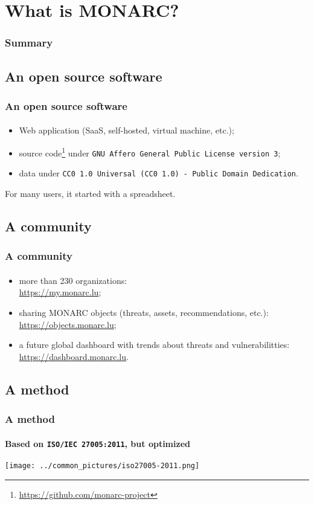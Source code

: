 %
%
\section{What is MONARC?}
\begin{frame}
    \frametitle{Summary}
\end{frame}
\subsection{An open source software}
\begin{frame}
\frametitle{An open source software}
\framesubtitle{}
    \begin{itemize}
        \item Web application (SaaS, self-hosted, virtual machine, etc.);
        \item source code\footnote{\url{https://github.com/monarc-project}} under \texttt{GNU Affero General Public License version 3};
        \item data under \texttt{CC0 1.0 Universal (CC0 1.0) - Public Domain Dedication}.
    \end{itemize}
    \bigskip
    For many users, it started with a spreadsheet.
\end{frame}

\subsection{A community}
\begin{frame}
\frametitle{A community}
\framesubtitle{}
  \begin{itemize}
    \item more than 230 organizations:\\ \url{https://my.monarc.lu};
    \item sharing MONARC objects (threats, assets, recommendations, etc.):\\ \url{https://objects.monarc.lu};
    \item a future global dashboard with trends about threats and vulnerabilitties:\\ \url{https://dashboard.monarc.lu}.
  \end{itemize}
\end{frame}

\subsection{A method}
\begin{frame}
\frametitle{A method}
\framesubtitle{Based on \texttt{ISO/IEC 27005:2011}, but optimized}
    \begin{center}
        \texttt{[image: ../common\_pictures/iso27005-2011.png]}
    \end{center}
\end{frame}
